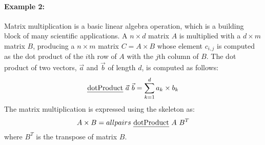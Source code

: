 \paragraph{Example 2:}
Matrix multiplication is a basic linear algebra operation, which is a building block of many scientific applications.
A $n\times d$ matrix $A$ is multiplied with a $d\times m$ matrix $B$, producing a $n\times m$ matrix $C=A\times B$ whose element $c_{i,j}$ is computed as the dot product of the $i$th row of $A$ with the $j$th column of $B$.
The dot product of two vectors, $\vec{a}$ and $\vec{b}$ of length $d$, is computed as follows:
\begin{equation}
  \dotProduct\ \vec{a}\ \vec{b} = \sum_{k=1}^d a_k \times b_k
\end{equation}
The matrix multiplication is expressed using the \allpairs skeleton as:
\begin{equation}
  A\times B = allpairs\ \mbox{\emph{dotProduct}}\ A\ B^T
  \label{eq:mat_mult_allpairs}
\end{equation}
where $B^T$ is the transpose of matrix $B$.

%



